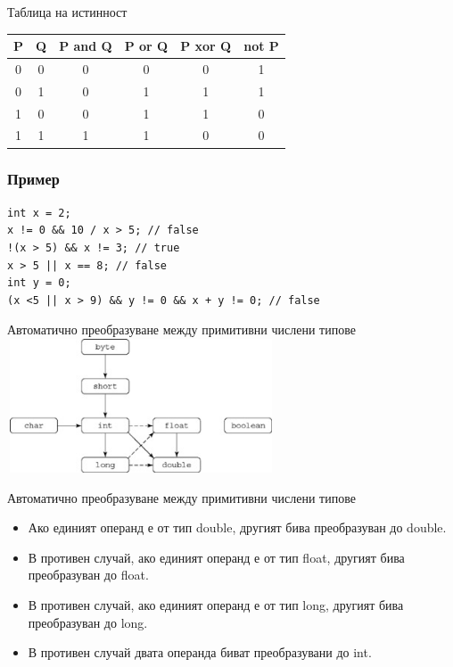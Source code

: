 \documentclass{beamer}
\begin{document}
\begin{frame}{Таблица на истинност}
  \transdissolve 
  \begin{tabular}{|c|c|c|c|c|c|}
    \hline
    P & Q & P and Q & P or Q & P xor Q & not P \\
    \hline
    0 & 0 & 0 & 0 & 0 & 1 \\
    \hline
    0 & 1 & 0 & 1 & 1 & 1 \\
    \hline
    1 & 0 & 0 & 1 & 1 & 0 \\
    \hline
    1 & 1 & 1 & 1 & 0 & 0 \\
    \hline
  \end{tabular} 
\end{frame}

\begin{frame}[fragile]
  \frametitle{Пример}
  \transdissolve
\begin{lstlisting}
int x = 2;
x != 0 && 10 / x > 5; // false
!(x > 5) && x != 3; // true
x > 5 || x == 8; // false
int y = 0;
(x <5 || x > 9) && y != 0 && x + y != 0; // false
\end{lstlisting}
\end{frame}

\begin{frame}{{Автоматично преобразуване между примитивни числени типове}}
  \transdissolve
  \includegraphics[height=150px, width=300px]{images/conversions.jpg}
\end{frame}

\begin{frame}{Автоматично преобразуване между примитивни числени типове}
  \transdissolve
  \begin{itemize}
    \item Ако единият операнд е от тип double, другият бива
      преобразуван до double.
    \item В противен случай, ако единият операнд е от тип float,
      другият бива преобразуван до float.
    \item В противен случай, ако единият операнд е от тип long,
      другият бива преобразуван до long.
    \item В противен случай двата операнда биват преобразувани до int.
  \end{itemize}
\end{frame}
\end{document}
